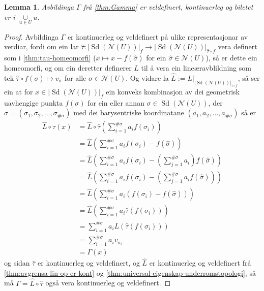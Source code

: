 \documentclass[a4paper, 12pt, norsk]{article}
\theoremstyle{plain}
\newtheorem{lemma}[theorem]{Lemma}
\theoremstyle{definition}
\newcommand{\Nc}{\mathcal{N}}
\newcommand{\union}{ \mathop{\cup}\limits }
\newcommand{\gr}[1]{ \lvert #1 \rvert } %
\newcommand{\tuple}[1]{ \left( #1 \right) } %
\DeclareMathOperator{\Sd}{Sd} %
\begin{document}
\begin{lemma} \label{thm:Gamma-eigenskapar}
	Avbildinga \( \Gamma \) frå \autoref{thm:Gamma} er veldefinert, kontinuerleg og biletet er i \( \union_{u\in U} u \).
\end{lemma}

\begin{proof}
	Avbildinga \( \Gamma \) er kontinuerleg og veldefinert på ulike representasjonar av verdiar, fordi om ein lar \( \hat{\tau} : \gr{\Sd(\Nc(U))}_f \to \gr{\Sd(\Nc(U))}_{\hat{\tau} \circ f} \) vera definert som i \autoref{thm:tau-homeomorfi} (\( x \mapsto x - f(\hat{\sigma}) \) for ein \( \hat{\sigma} \in \Nc(U) \)), så er dette ein homeomorfi, og om ein deretter definerer \( L \) til å vera ein lineæravblildning som tek \( \hat{\tau} \circ f (\sigma) \mapsto v_{\sigma} \) for alle \( \sigma \in \Nc(U) \). Og vidare la \( \hat{L} := L|_{\gr{\Sd(\Nc(U))}_{\hat{\tau}\circ f}} \), så ser ein at for \( x \in \gr{\Sd(\Nc(U))}_f \) ein konveks kombinasjon av dei geometrisk uavhengige punkta \( f(\sigma) \) for ein eller annan \( \sigma \in \Sd(\Nc(U)) \), der \( \sigma = \tuple{\sigma_1, \sigma_2, \dots, \sigma_{\#\sigma}} \) med dei barysentriske koordinatane \( \tuple{a_1, a_2, \dots, a_{\#\sigma}} \) så er
	\begin{align*}
		\hat{L} \circ \hat{\tau} (x) &= \hat{L} \circ \hat{\tau} \tuple{\sum_{i=1}^{\#\sigma}a_i f(\sigma_i)} \\
		&= \hat{L} \tuple{\sum_{i=1}^{\#\sigma}a_i f(\sigma_i)-f(\hat{\sigma})} \\
		&= \hat{L} \tuple{\sum_{i=1}^{\#\sigma}a_i f(\sigma_i)-\tuple{\sum_{j=1}^{\#\sigma}a_i}f(\hat{\sigma})} \\
		&= \hat{L} \tuple{\sum_{i=1}^{\#\sigma}a_i f(\sigma_i)-\tuple{\sum_{j=1}^{\#\sigma}a_if(\hat{\sigma})}} \\
		&= \hat{L} \tuple{\sum_{i=1}^{\#\sigma}a_i\tuple{f(\sigma_i)-f(\hat{\sigma})}} \\
		&= \hat{L} \tuple{\sum_{i=1}^{\#\sigma}a_i\hat{\tau}\tuple{f(\sigma_i)}} \\
		&= \sum_{i=1}^{\#\sigma}a_iL\tuple{\hat{\tau}\tuple{f(\sigma_i)}} \\
		&= \sum_{i=1}^{\#\sigma}a_i v_{\sigma_i} \\
		&= \Gamma(x)
	\end{align*}
	og sidan \( \hat{\tau} \) er kontinuerleg og veldefinert, og \( \hat{L} \) er kontinuerleg og veldefinert frå \autoref{thm:avgrensa-lin-op-er-kont} og \autoref{thm:universal-eigenskap-underromstopologi}, så må \( \Gamma = \hat{L}\circ\hat{\tau} \) også vera kontinuerleg og veldefinert.


\end{proof}
\end{document}
